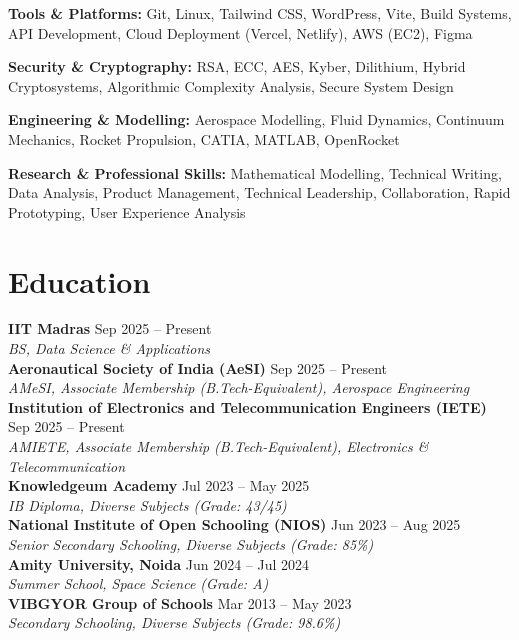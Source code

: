 \documentclass[a4paper,10pt]{article}
\begin{document}
\textbf{Tools \& Platforms:} Git, Linux, Tailwind CSS, WordPress, Vite, Build Systems, API Development, Cloud Deployment (Vercel, Netlify), AWS (EC2), Figma

\textbf{Security \& Cryptography:} RSA, ECC, AES, Kyber, Dilithium, Hybrid Cryptosystems, Algorithmic Complexity Analysis, Secure System Design

\textbf{Engineering \& Modelling:} Aerospace Modelling, Fluid Dynamics, Continuum Mechanics, Rocket Propulsion, CATIA, MATLAB, OpenRocket


\textbf{Research \& Professional Skills:} Mathematical Modelling, Technical Writing, Data Analysis, Product Management, Technical Leadership, Collaboration, Rapid Prototyping, User Experience Analysis


\section*{\color{accent} Education}

\textbf{IIT Madras} \hfill Sep 2025 -- Present\\
\emph{BS, Data Science \& Applications}\\[2pt]
\textbf{Aeronautical Society of India (AeSI)} \hfill Sep 2025 -- Present\\
\emph{AMeSI, Associate Membership (B.Tech-Equivalent), Aerospace Engineering}\\[2pt]
\textbf{Institution of Electronics and Telecommunication Engineers (IETE)} \hfill Sep 2025 -- Present\\
\emph{AMIETE, Associate Membership (B.Tech-Equivalent), Electronics \& Telecommunication}\\[2pt]
\textbf{Knowledgeum Academy} \hfill Jul 2023 -- May 2025\\
\emph{IB Diploma, Diverse Subjects (Grade: 43/45)}\\[2pt]
\textbf{National Institute of Open Schooling (NIOS)} \hfill Jun 2023 -- Aug 2025\\
\emph{Senior Secondary Schooling, Diverse Subjects (Grade: 85\%)}\\[2pt]
\textbf{Amity University, Noida} \hfill Jun 2024 -- Jul 2024\\
\emph{Summer School, Space Science (Grade: A)}\\[2pt]
\textbf{VIBGYOR Group of Schools} \hfill Mar 2013 -- May 2023\\
\emph{Secondary Schooling, Diverse Subjects (Grade: 98.6\%)}
\end{document}

